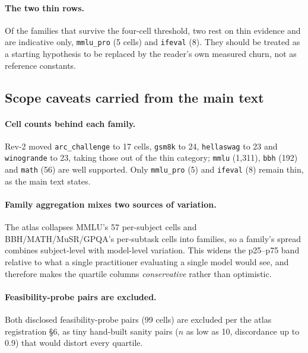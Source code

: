 \paragraph{The two thin rows.} Of the families that survive the four-cell
threshold, two rest on thin evidence and are indicative only,
\texttt{mmlu\_pro} (5 cells) and \texttt{ifeval} (8). They should be treated as
a starting hypothesis to be replaced by the reader's own measured churn, not as
reference constants.

\subsection{Scope caveats carried from the main text}
\label{app:cert:caveats-detail}


\paragraph{Cell counts behind each family.} Rev-2 moved
\texttt{arc\_challenge} to 17 cells, \texttt{gsm8k} to 24, \texttt{hellaswag}
to 23 and \texttt{winogrande} to 23, taking those out of the thin category;
\texttt{mmlu} (1{,}311), \texttt{bbh} (192) and \texttt{math} (56) are well
supported. Only \texttt{mmlu\_pro} (5) and \texttt{ifeval} (8) remain thin, as
the main text states.

\paragraph{Family aggregation mixes two sources of variation.} The atlas
collapses MMLU's 57 per-subject cells and BBH/MATH/MuSR/GPQA's per-subtask cells
into families, so a family's spread combines subject-level with model-level
variation. This widens the p25--p75 band relative to what a single practitioner
evaluating a single model would see, and therefore makes the quartile columns
\emph{conservative} rather than optimistic.

\paragraph{Feasibility-probe pairs are excluded.} Both disclosed
feasibility-probe pairs (99 cells) are excluded per the atlas registration §6,
as tiny hand-built sanity pairs ($n$ as low as 10, discordance up to
0.9) that would distort every quartile.

